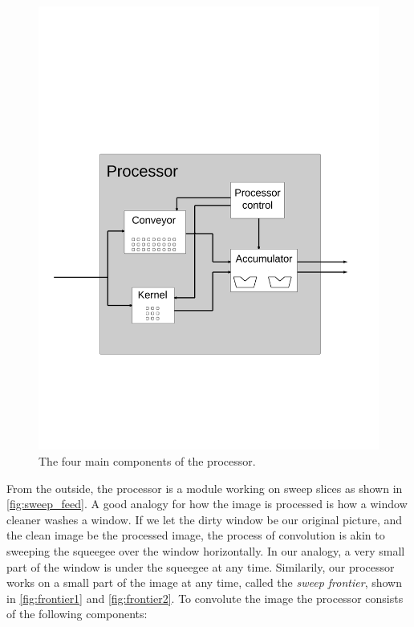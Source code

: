 \begin{figure}[h!]
    \includegraphics[width=\linewidth]{img/processor.png}
    \caption{The four main components of the processor.}
    \label{fig:convolution_processor}
\end{figure}

From the outside, the processor is a module working on sweep slices as shown in \ref{fig:sweep_feed}.
A good analogy for how the image is processed is how a window cleaner washes a window.
If we let the dirty window be our original picture, and the clean image be the processed image, the process of convolution is akin to sweeping the squeegee over the window horizontally.
In our analogy, a very small part of the window is under the squeegee at any time.
Similarily, our processor works on a small part of the image at any time, called the \textit{sweep frontier}, shown in \ref{fig:frontier1} and \ref{fig:frontier2}.
To convolute the image the processor consists of the following components:

